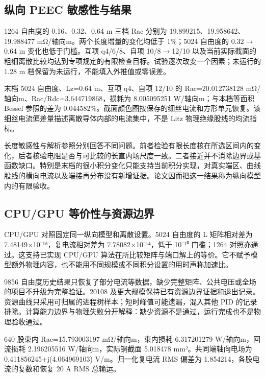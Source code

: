 \documentclass[journal,10pt]{IEEEtran}
\begin{document}
\subsection*{纵向 PEEC 敏感性与结果}
\hypertarget{03.peec_results.heading}{}
1264 自由度的 0.16、0.32、0.64 m 三档 Rac 分别为 19.899215、19.958642、19.988477 mΩ/轴向m。两个长度增量的变化均低于 1\%；5024 自由度的 0.32\(\to\)0.64 m 变化也低于门槛。互项 q4/6/8、自项 10/8\(\to\)12/10 以及当前实际截面的粗细离散比较均达到专项规定的有限检查目标。试验逐次改变一个因素；未运行的 1.28 m 档保留为未运行，不能填入外推值或零误差。


末档 5024 自由度、Lz=0.64 m、互项 q4、自项 12/10 的 Rac=20.012738128 mΩ/轴向m、Rac/Rdc=3.644719868，损耗为 8.005095251 W/轴向m；与本档等面积 Bessel 参照的差为 0.044582\%。截面颜色图按保存的细丝电流和方形单元恢复。该细丝电流偏差量描述离散导体内部的电流集中，不是 Litz 物理绝缘股线的均流指标。


长度敏感性与解析参照分别回答不同问题。前者检验有限长度核在所选区间内的变化，后者核验电阻是否与可比较的长直内场尺度一致。二者接近并不消除边界或基函数缺口。特别是末档的很小积分变化只能支持当前积分实现，对真实端区、曲线股线的横向电流以及端接再分布没有新增证据。论文因而把这一结果称为纵向模型内的有限验收。


\subsection*{CPU/GPU 等价性与资源边界}
\hypertarget{03.compute.heading}{}
CPU/GPU 对照固定同一纵向模型和离散设置。5024 自由度的 L 矩阵相对差为 7.48149×10⁻¹⁶，复电流相对差为 7.78082×10⁻¹⁴，低于 10⁻¹⁰ 门槛；1264 对照亦通过。这支持已实现 CPU/GPU 算法在所比较矩阵与端口解上的等价。它不赋予模型额外物理内容，也不能用不同规模或不同积分设置的用时声称加速比。


9856 自由度历史结果只恢复了部分电流等数据，缺少完整矩阵、公共电压或全场的项目不升级为完整验证。20108 及更大规模保持已有资源边界证据和退出记录。资源曲线只采用可归属的进程树样本；短时峰值可能遗漏，混入其他 PID 的记录排除。计算能力边界与物理失败分开解释：缺少资源不是通过，运行完成也不是物理验收通过。


640 股束内 Rac=15.793003197 mΩ/轴向m，束内损耗 6.317201279 W/轴向m，回流损耗 2.196205516 W/轴向m，实际铜截面 5.018478 mm²。共同端轴向电场为 0.411856245+j(4.064969103) V/m。归一化复电流 RMS 偏差为 1.854214，各股电流的复数和恢复 20 A RMS 总输运。
\end{document}

